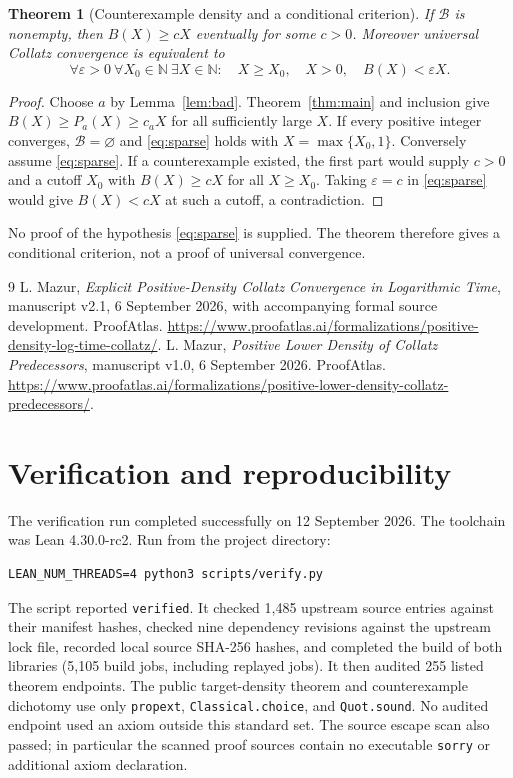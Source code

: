 \documentclass[11pt]{article}
\newtheorem{theorem}{Theorem}
\newcommand{\N}{\mathbb N}
\begin{document}
\begin{theorem}[Counterexample density and a conditional criterion]
If $\mathcal B$ is nonempty, then $B(X)\ge cX$ eventually for some $c>0$.
Moreover universal Collatz convergence is equivalent to
\begin{equation}\label{eq:sparse}
 \forall\varepsilon>0\ \forall X_0\in\N\ \exists X\in\N:\quad
 X\ge X_0,\quad X>0,\quad B(X)<\varepsilon X.
\end{equation}
\end{theorem}
\begin{proof}
Choose $a$ by Lemma~\ref{lem:bad}. Theorem~\ref{thm:main} and inclusion
give $B(X)\ge P_a(X)\ge c_aX$ for all sufficiently large $X$.
If every positive integer converges, $\mathcal B=\varnothing$ and
\eqref{eq:sparse} holds with $X=\max\{X_0,1\}$.
Conversely assume \eqref{eq:sparse}. If a counterexample existed, the
first part would supply $c>0$ and a cutoff $X_0$ with $B(X)\ge cX$
for all $X\ge X_0$. Taking $\varepsilon=c$ in \eqref{eq:sparse}
would give $B(X)<cX$ at such a cutoff, a contradiction.
\end{proof}
No proof of the hypothesis \eqref{eq:sparse} is supplied. The theorem
therefore gives a conditional criterion, not a proof of universal convergence.

\begin{thebibliography}{9}
L. Mazur, \emph{Explicit Positive-Density Collatz Convergence in
Logarithmic Time}, manuscript v2.1, 6 September 2026, with accompanying
formal source development. ProofAtlas.
\url{https://www.proofatlas.ai/formalizations/positive-density-log-time-collatz/}.
L. Mazur, \emph{Positive Lower Density of Collatz Predecessors},
manuscript v1.0, 6 September 2026. ProofAtlas.
\url{https://www.proofatlas.ai/formalizations/positive-lower-density-collatz-predecessors/}.
\end{thebibliography}

\clearpage
\appendix
\section{Verification and reproducibility}
The verification run completed successfully on 12 September 2026.
The toolchain was Lean 4.30.0-rc2. Run from the project directory:
\begin{Verbatim}[breaklines=true]
LEAN_NUM_THREADS=4 python3 scripts/verify.py
\end{Verbatim}
The script reported \texttt{verified}. It checked 1,485 upstream source
entries against their manifest hashes, checked nine dependency revisions
against the upstream lock file, recorded local source SHA-256 hashes,
and completed the build of both libraries (5,105 build jobs, including
replayed jobs). It then audited 255 listed theorem endpoints. The public
target-density theorem and counterexample dichotomy use only
\texttt{propext}, \texttt{Classical.choice}, and \texttt{Quot.sound}.
No audited endpoint used an axiom outside this standard set. The source
escape scan also passed; in particular the scanned proof sources contain
no executable \texttt{sorry} or additional axiom declaration.
\end{document}
